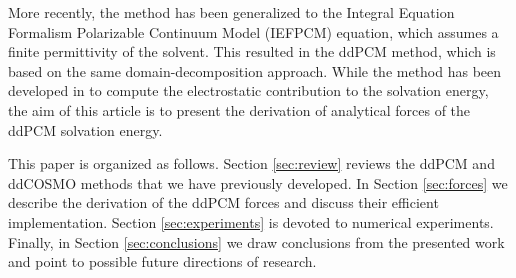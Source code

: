 More recently, the method has been generalized to the Integral Equation Formalism Polarizable Continuum Model (IEFPCM) equation\cite{Mennucci_JCP_IEF1,Mennucci_JMC_IEF2,Mennucci_JPCB_IEF3}, which assumes a finite permittivity of the solvent. This resulted in the ddPCM method\cite{Stamm_JCP_DDPCM}, which is based on the same domain-decomposition approach. 
While the method has been developed in \cite{Stamm_JCP_DDPCM} to compute the electrostatic contribution to the solvation energy, the aim of this article is to present the derivation of analytical forces of the ddPCM solvation energy.

This paper is organized as follows. Section \ref{sec:review} reviews the ddPCM and ddCOSMO methods that we have previously developed. In Section \ref{sec:forces} we describe the derivation of the ddPCM forces and discuss their efficient implementation. Section \ref{sec:experiments} is devoted to numerical experiments. Finally, in Section \ref{sec:conclusions} we draw conclusions from the presented work and point to possible future directions of research.